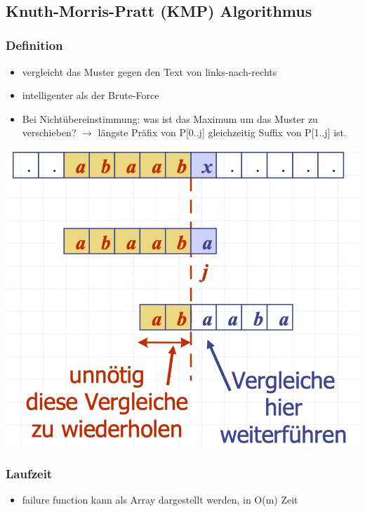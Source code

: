 \vfill
$ $
\columnbreak










\subsection{Knuth-Morris-Pratt (KMP) Algorithmus}
\subsubsection{Definition}
\begin{itemize}
    \item vergleicht das Muster gegen den Text von links-nach-rechts
    \item intelligenter als der Brute-Force
    \item Bei Nichtübereinstimmung: was ist das Maximum um das Muster zu verschieben? $\rightarrow$ längste Präfix von P[0..j] gleichzeitig Suffix von P[1..j] ist.
\end{itemize}
\vspace{-8pt}
\begin{center}
    \includegraphics[scale=.2]{graphic/08 PatternMatching/KMP def.png}
\end{center}
\vspace{-8pt}
\subsubsection{Laufzeit}
\begin{itemize}
    \item failure function kann als Array dargestellt werden, in O(m) Zeit
\end{itemize}
